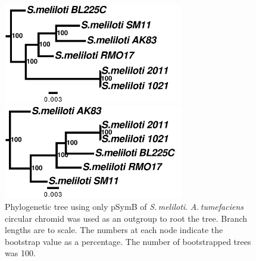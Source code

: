 \documentclass[11pt]{article}
\newcommand{\smel}{\textit{S.\,meliloti}\xspace}
\newcommand{\agro}{\textit{A.\,tumefaciens}\xspace}
\begin{document}
		\begin{figure}
		\begin{center}
			\includegraphics[width=0.7\textwidth]{./figs/pSymA_chrom_figtree_raw_29Aug20.pdf}
			\caption{\label{fig:sinoPAtree} Phylogenetic tree using only pSymA of \smel. \agro circular plasmid was used as an outgroup to root the tree. Branch lengths are to scale. The numbers at each node indicate the bootstrap value as a percentage. The number of bootstrapped trees was 100.}
		\end{center}
		\vspace*{\floatsep}%
			\begin{center}
				
				\includegraphics[width=0.7\textwidth]{./figs/pSymB_chrom_figtree_raw_29Aug20.pdf}
				\caption{\label{fig:sinoPBtree} Phylogenetic tree using only pSymB of \smel. \agro circular chromid was used as an outgroup to root the tree. Branch lengths are to scale. The numbers at each node indicate the bootstrap value as a percentage. The number of bootstrapped trees was 100.}
			\end{center}
		\end{figure}
	
\end{document}
